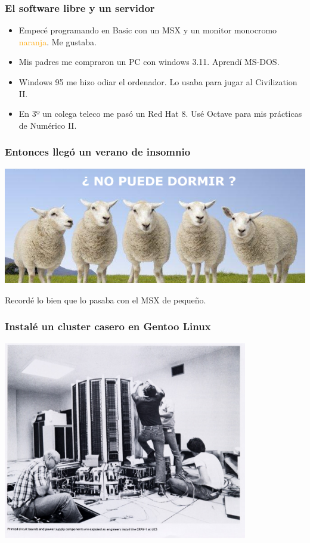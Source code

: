 \documentclass[12pt,mathserif,compress]{beamer}
\begin{document}
\begin{frame}
\frametitle{El software libre y un servidor}
\begin{itemize}
\item Empecé programando en Basic con un MSX y un monitor monocromo
  \textcolor{orange}{naranja}. Me gustaba.
\pause
\item Mis padres me compraron un PC con windows 3.11. Aprendí
  MS-DOS.
\pause
\item Windows 95 me hizo odiar el ordenador. Lo usaba para jugar al
  Civilization II.
\pause
\item En 3º un colega teleco me pasó un Red Hat 8.  Usé Octave para
  mis prácticas de Numérico II.
\end{itemize}
\end{frame}

\begin{frame} \frametitle{Entonces llegó un verano de insomnio}
\begin{center}
 \includegraphics[width=\textwidth]{files/insomnio-ovejas.png}\\
\end{center}
\end{frame}

\begin{frame}
  \begin{center}
    Recordé lo bien que lo pasaba con el MSX de pequeño.
  \end{center}
\end{frame}

\begin{frame}
  \frametitle{Instalé un cluster casero en Gentoo Linux}
  \begin{center}
 \includegraphics[width=0.8\textwidth]{files/ucs_Cray1_install.jpg}    
  \end{center}
\end{frame}
\end{document}
